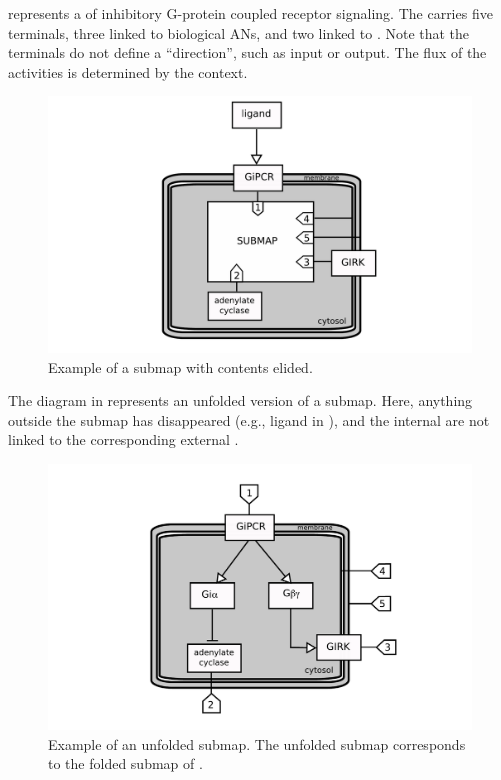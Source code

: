  represents a  of inhibitory G-protein coupled receptor signaling. The  carries five terminals, three linked to biological ANs, and two linked to .  Note that the terminals do not define a ``direction'', such as input or output.  The flux of the activities is determined by the context.

\begin{figure}[H]
  \centering
  \includegraphics[scale = 0.5]{examples/submap-folded}
  \caption{Example of a submap with contents elided.}
  \label{fig:submap-folded}
\end{figure}

The diagram in  represents an unfolded version of a submap.  Here, anything outside the submap has disappeared (e.g., ligand in ), and the internal  are not linked to the corresponding external .

\begin{figure}[H]
  \centering
  \includegraphics[scale = 0.5]{examples/submap-dissociated}
  \caption{Example of an unfolded submap. The unfolded submap corresponds to the folded submap of .}
  \label{fig:submap-unfolded}
\end{figure}
